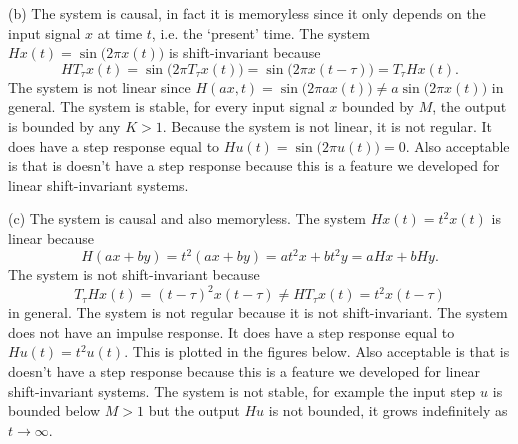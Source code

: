 \begin{excersizelist}
\begin{solution}
(b) The system is causal, in fact it is memoryless since it only depends on the input signal $x$ at time $t$, i.e. the `present' time.  The system $Hx(t) = \sin\big(2\pi x(t)\big)$ is shift-invariant because 
\[
H T_\tau x(t) = \sin\big(2\pi T_\tau x(t)\big) = \sin\big(2\pi x(t-\tau)\big) = T_\tau H x(t).
\]
The system is not linear since $H(ax,t) = \sin\big(2\pi a x(t)\big) \neq a \sin\big(2\pi x(t)\big)$ in general.  The system is stable, for every input signal $x$ bounded by $M$, the output is bounded by any $K > 1$.  Because the system is not linear, it is not regular. It does have a step response equal to $Hu(t) = \sin\big(2\pi u(t)\big) = 0$.  Also acceptable is that is doesn't have a step response because this is a feature we developed for linear shift-invariant systems.

(c) The system is causal and also memoryless.  The system $Hx(t) = t^2x(t)$ is linear because 
\[
H(ax+by) = t^2(ax+by) = at^2x + bt^2y = aH x + bHy.
\]
The system is not shift-invariant because
\[
T_\tau H x(t) = (t-\tau)^2x(t-\tau) \neq H T_\tau x(t) = t^2 x(t - \tau)
\]
in general.  The system is not regular because it is not shift-invariant.  The system does not have an impulse response.  It does have a step response equal to $Hu(t) = t^2u(t)$.  This is plotted in the figures below.  Also acceptable is that is doesn't have a step response because this is a feature we developed for linear shift-invariant systems.  The system is not stable, for example the input step $u$ is bounded below $M > 1$ but the output $Hu$ is not bounded, it grows indefinitely as $t \to \infty$.


\end{solution}
\end{excersizelist}
